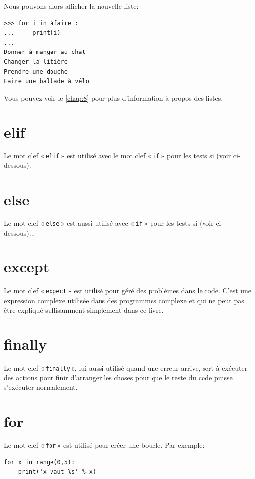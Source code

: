 Nous pouvons alors afficher la nouvelle liste:
\begin{Verbatim}[frame=single,rulecolor=\color{gray}]
>>> for i in àfaire :
...     print(i)
...
Donner à manger au chat
Changer la litière
Prendre une douche
Faire une ballade à vélo
\end{Verbatim}

Vous pouvez voir le \autoref{chap:8} pour plus d'information à propos des listes.

\section*{elif}

Le mot clef « \texttt{elif} » est utilisé avec le mot clef « \texttt{if} » pour les tests si (voir ci-dessous). 

\section*{else}

Le mot clef « \texttt{else} » est aussi utilisé avec « \texttt{if} » pour les tests si (voir ci-dessous)...

\section*{except}

Le mot clef « \texttt{expect} » est utilisé pour géré des problèmes dans le code. C'est une expression complexe utilisée dans des programmes complexe et qui ne peut pas être expliqué suffisamment simplement dans ce livre. 


\section*{finally}

Le mot clef « \texttt{finally} », lui aussi utilisé quand une erreur arrive, sert à exécuter des actions pour finir d'arranger les choses pour que le reste du code puisse s'exécuter normalement.

\section*{for}

Le mot clef « \texttt{for} » est utilisé pour créer une boucle. Par exemple:
\begin{Verbatim}[frame=single,rulecolor=\color{gray}]
for x in range(0,5):
    print('x vaut %s' % x)
\end{Verbatim}

